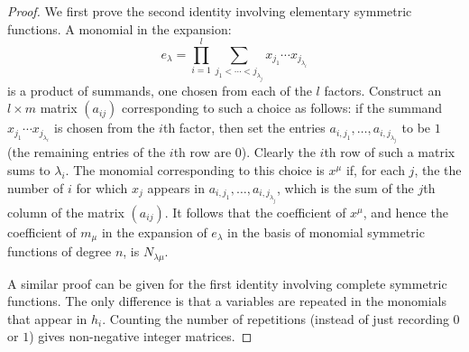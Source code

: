 \documentclass[12pt]{amsart}
\theoremstyle{definition}
\theoremstyle{example}
\begin{document}
\begin{proof}
  We first prove the second identity involving elementary symmetric functions.
  A monomial in the expansion:
  \begin{displaymath}
    e_\lambda = \prod_{i=1}^l \sum_{j_1<\dotsb<j_{\lambda_j}}x_{j_1}\dotsb x_{j_{\lambda_i}}
  \end{displaymath}
  is a product of summands, one chosen from each of the $l$ factors.
  Construct an $l\times m$ matrix $(a_{ij})$ corresponding to such a choice as follows:
  if the summand $x_{j_1}\dotsb x_{j_{\lambda_i}}$ is chosen from the $i$th factor, then set the entries $a_{i,j_1},\dotsc, a_{i, j_{\lambda_j}}$ to be $1$ (the remaining entries of the $i$th row are $0$).
  Clearly the $i$th row of such a matrix sums to $\lambda_i$.
  The monomial corresponding to this choice is $x^\mu$ if, for each $j$, the the number of $i$ for which $x_j$ appears in $a_{i,j_1},\dotsc, a_{i, j_{\lambda_j}}$, which is the sum of the $j$th column of the matrix $(a_{ij})$.
  It follows that the coefficient of $x^\mu$, and hence the coefficient of $m_\mu$ in the expansion of $e_\lambda$ in the basis of monomial symmetric functions of degree $n$, is $N_{\lambda\mu}$.

A similar proof can be given for the first identity involving complete symmetric functions. The only difference is that a variables are repeated in the monomials that appear in $h_i$. Counting the number of repetitions (instead of just recording $0$ or $1$) gives non-negative integer matrices.
\end{proof}
\end{document}
